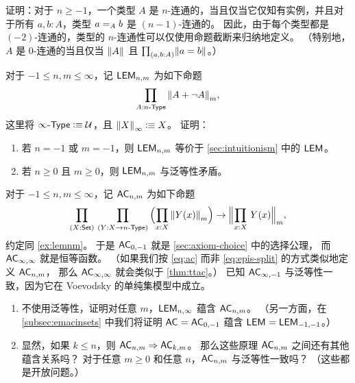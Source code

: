 \begin{ex}\label{ex:connectivity-inductively}
  证明：对于 $n\ge -1$，一个类型 $A$ 是 $n$-连通的，当且仅当它仅知有实例，并且对于所有 $a,b:A$，类型 $\id[A]ab$ 是 $(n-1)$-连通的。
  因此，由于每个类型都是 $(-2)$-连通的，类型的 $n$-连通性可以仅使用命题截断来归纳地定义。
  （特别地，$A$ 是 $0$-连通的当且仅当 $\brck{A}$ 且 $\prd{a,b:A} \brck{a=b}$。）
\end{ex}

\begin{ex}\label{ex:lemnm}
  对于 $-1\le n,m \le\infty$，记 $\LEM{n,m}$ 为如下命题
  \[ \prd{A:\ntype{n}} \trunc m{A + \neg A},\]
  这里将 $\ntype{\infty} \defeq \type$，且 $\trunc{\infty}{X}\defeq X$。
  证明：
  \begin{enumerate}
  \item 若 $n=-1$ 或 $m=-1$，则 $\LEM{n,m}$ 等价于 \cref{sec:intuitionism} 中的 $\LEM{}$。
  \item 若 $n\ge 0$ 且 $m\ge 0$，则 $\LEM{n,m}$ 与泛等性矛盾。
  \end{enumerate}
\end{ex}

\begin{ex}\label{ex:acnm}
  对于 $-1\le n,m\le\infty$，记 $\choice{n,m}$ 为如下命题
  \[ \prd{X:\set}{Y:X\to\ntype{n}}
  \Parens{\prd{x:X} \trunc m{Y(x)}}
  \to
  \Trunc m{\prd{x:X} Y(x)},
  \]
  约定同 \cref{ex:lemnm}。
  于是 $\choice{0,-1}$ 就是 \cref{sec:axiom-choice} 中的选择公理，
  而 $\choice{\infty,\infty}$ 就是恒等函数。
  （如果我们按 \eqref{eq:ac} 而非 \eqref{eq:epis-split} 的方式类似地定义 $\choice{n,m}$，
  那么 $\choice{\infty,\infty}$ 就会类似于 \cref{thm:ttac}。）
  已知 $\choice{\infty,-1}$ 与泛等性一致，因为它在 Voevodsky 的单纯集模型中成立。
  \begin{enumerate}
  \item 不使用泛等性，证明对任意 $m$，$\LEM{n,\infty}$ 蕴含 $\choice{n,m}$。
    （另一方面，在 \cref{subsec:emacinsets} 中我们将证明 $\choice{}=\choice{0,-1}$ 蕴含 $\LEM{}=\LEM{-1,-1}$。）
  \item 显然，如果 $k\le n$，则 $\choice{n,m}\Rightarrow \choice{k,m}$。
    那么这些原理 $\choice{n,m}$ 之间还有其他蕴含关系吗？
    对于任意 $m\ge 0$ 和任意 $n$，$\choice{n,m}$ 与泛等性一致吗？
    （这些都是开放问题。）
  \end{enumerate}
\end{ex}

